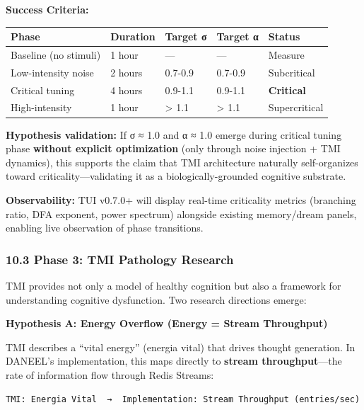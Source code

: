 \documentclass[
  11pt,
]{article}
\newcounter{none} %
\begin{document}
\textbf{Success Criteria:}

{\def\LTcaptype{none} %
\begin{longtable}[]{@{}lllll@{}}
\toprule\noalign{}
Phase & Duration & Target σ & Target α & Status \\
\midrule\noalign{}
\endhead
\bottomrule\noalign{}
\endlastfoot
Baseline (no stimuli) & 1 hour & --- & --- & Measure \\
Low-intensity noise & 2 hours & 0.7-0.9 & 0.7-0.9 & Subcritical \\
Critical tuning & 4 hours & 0.9-1.1 & 0.9-1.1 & \textbf{Critical} \\
High-intensity & 1 hour & \textgreater{} 1.1 & \textgreater{} 1.1 &
Supercritical \\
\end{longtable}
}

\textbf{Hypothesis validation:} If σ ≈ 1.0 and α ≈ 1.0 emerge during
critical tuning phase \textbf{without explicit optimization} (only
through noise injection + TMI dynamics), this supports the claim that
TMI architecture naturally self-organizes toward
criticality---validating it as a biologically-grounded cognitive
substrate.

\textbf{Observability:} TUI v0.7.0+ will display real-time criticality
metrics (branching ratio, DFA exponent, power spectrum) alongside
existing memory/dream panels, enabling live observation of phase
transitions.

\subsubsection{10.3 Phase 3: TMI Pathology
Research}\label{phase-3-tmi-pathology-research}

TMI provides not only a model of healthy cognition but also a framework
for understanding cognitive dysfunction. Two research directions emerge:

\textbf{Hypothesis A: Energy Overflow (Energy = Stream Throughput)}

TMI describes a ``vital energy'' (energia vital) that drives thought
generation. In DANEEL's implementation, this maps directly to
\textbf{stream throughput}---the rate of information flow through Redis
Streams:

\begin{verbatim}
TMI: Energia Vital  →  Implementation: Stream Throughput (entries/sec)
\end{verbatim}
\end{document}
